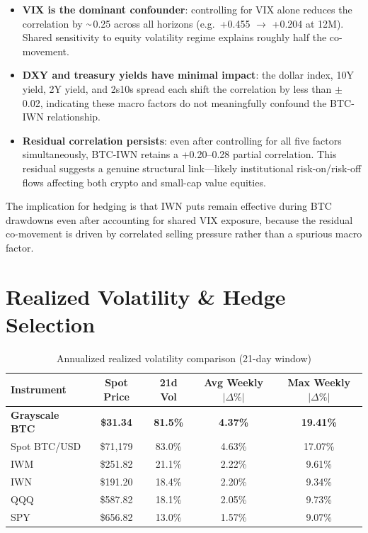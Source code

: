 \documentclass[11pt,letterpaper]{article}
\begin{document}
\medskip
\begin{itemize}[itemsep=4pt]
  \item \textbf{VIX is the dominant confounder}: controlling for VIX alone
        reduces the correlation by ${\raise.17ex\hbox{$\scriptstyle\sim$}}$0.25
        across all horizons (e.g.\ +0.455 $\to$ +0.204 at 12M). Shared
        sensitivity to equity volatility regime explains roughly half the
        co-movement.
  \item \textbf{DXY and treasury yields have minimal impact}: the dollar
        index, 10Y yield, 2Y yield, and 2s10s spread each shift the
        correlation by less than $\pm$0.02, indicating these macro factors
        do not meaningfully confound the BTC-IWN relationship.
  \item \textbf{Residual correlation persists}: even after controlling for
        all five factors simultaneously, BTC-IWN retains a +0.20--0.28
        partial correlation. This residual suggests a genuine structural
        link---likely institutional risk-on/risk-off flows affecting both
        crypto and small-cap value equities.
\end{itemize}

\medskip
\noindent The implication for hedging is that IWN puts remain effective during
BTC drawdowns even after accounting for shared VIX exposure, because the
residual co-movement is driven by correlated selling pressure rather than a
spurious macro factor.

\section{Realized Volatility \& Hedge Selection}

\begin{table}[H]
\centering
\caption{Annualized realized volatility comparison (21-day window)}
\begin{tabular}{lcccc}
\toprule
Instrument & Spot Price & 21d Vol & Avg Weekly $|\Delta\%|$ & Max Weekly $|\Delta\%|$ \\
\midrule
\textbf{Grayscale BTC} & \textbf{\$31.34} & \textbf{81.5\%} & \textbf{4.37\%} & \textbf{19.41\%} \\
Spot BTC/USD & \$71,179 & 83.0\% & 4.63\% & 17.07\% \\
IWM  & \$251.82 & 21.1\% & 2.22\% & 9.61\% \\
IWN  & \$191.20 & 18.4\% & 2.20\% & 9.34\% \\
QQQ  & \$587.82 & 18.1\% & 2.05\% & 9.73\% \\
SPY  & \$656.82 & 13.0\% & 1.57\% & 9.07\% \\
\bottomrule
\end{tabular}
\end{table}
\end{document}
